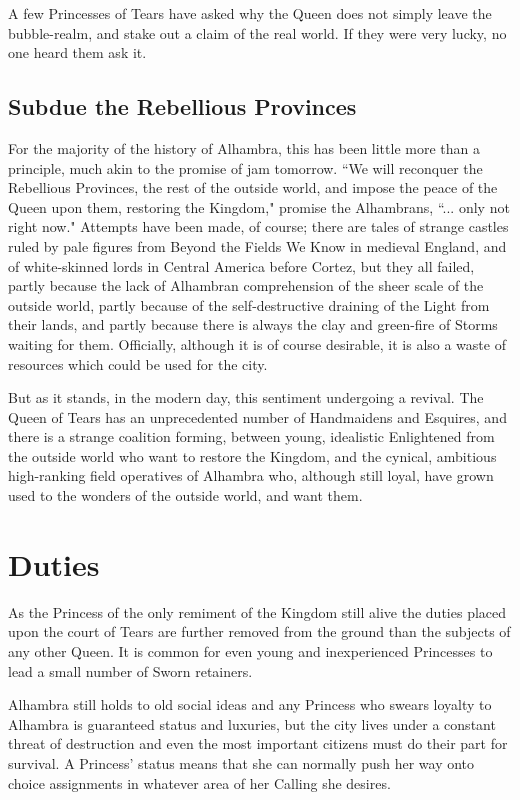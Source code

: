 A few Princesses of Tears have asked why the Queen does not simply leave the bubble-realm, and stake out a claim of the real world. If they were very lucky, no one heard them ask it. 

\subsection*{Subdue the Rebellious Provinces}

For the majority of the history of Alhambra, this has been little more than a principle, much akin to the promise of jam tomorrow. \textquotedblleft We will reconquer the Rebellious Provinces, the rest of the outside world, and impose the peace of the Queen upon them, restoring the Kingdom," promise the Alhambrans, \textquotedblleft ... only not right now." Attempts have been made, of course; there are tales of strange castles ruled by pale figures from Beyond the Fields We Know in medieval England, and of white-skinned lords in Central America before Cortez, but they all failed, partly because the lack of Alhambran comprehension of the sheer scale of the outside world, partly because of the self-destructive draining of the Light from their lands, and partly because there is always the clay and green-fire of Storms waiting for them. Officially, although it is of course desirable, it is also a waste of resources which could be used for the city. 

But as it stands, in the modern day, this sentiment undergoing a revival. The Queen of Tears has an unprecedented number of Handmaidens and Esquires, and there is a strange coalition forming, between young, idealistic Enlightened from the outside world who want to restore the Kingdom, and the cynical, ambitious high-ranking field operatives of Alhambra who, although still loyal, have grown used to the wonders of the outside world, and want them. 

\section*{Duties}

As the Princess of the only remiment of the Kingdom still alive the duties placed upon the court of Tears are further removed from the ground than the subjects of any other Queen. It is common for even young and inexperienced Princesses to lead a small number of Sworn retainers. 

Alhambra still holds to old social ideas and any Princess who swears loyalty to Alhambra is guaranteed status and luxuries, but the city lives under a constant threat of destruction and even the most important citizens must do their part for survival. A Princess' status means that she can normally push her way onto choice assignments in whatever area of her Calling she desires. 

